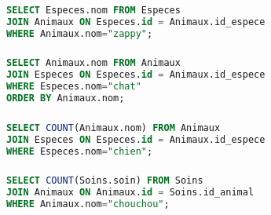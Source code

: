 \documentclass[svgnames,11pt]{beamer}
\begin{document}
\begin{frame}[fragile]
    \frametitle{}

\begin{center}
\begin{lstlisting}[language=SQL , basicstyle=\ttfamily\small, xleftmargin=.5em, xrightmargin=0em]
SELECT Especes.nom FROM Especes
JOIN Animaux ON Especes.id = Animaux.id_espece
WHERE Animaux.nom="zappy";
\end{lstlisting}
\label{CODE}
\end{center}

\end{frame} 
\begin{frame}[fragile]
    \frametitle{}

\begin{center}
\begin{lstlisting}[language=SQL , basicstyle=\ttfamily\small, xleftmargin=.5em, xrightmargin=0em]
SELECT Animaux.nom FROM Animaux
JOIN Especes ON Especes.id = Animaux.id_espece
WHERE Especes.nom="chat"
ORDER BY Animaux.nom;
\end{lstlisting}
\label{CODE}
\end{center}

\end{frame}
\begin{frame}[fragile]
    \frametitle{}

\begin{center}
\begin{lstlisting}[language=SQL , basicstyle=\ttfamily\small, xleftmargin=.5em, xrightmargin=0em]
SELECT COUNT(Animaux.nom) FROM Animaux
JOIN Especes ON Especes.id = Animaux.id_espece
WHERE Especes.nom="chien";
\end{lstlisting}
\label{CODE}
\end{center}

\end{frame}
\begin{frame}[fragile]
    \frametitle{}

\begin{center}
\begin{lstlisting}[language=SQL , basicstyle=\ttfamily\small, xleftmargin=.5em, xrightmargin=0em]
SELECT COUNT(Soins.soin) FROM Soins
JOIN Animaux ON Animaux.id = Soins.id_animal
WHERE Animaux.nom="chouchou";
\end{lstlisting}
\label{CODE}
\end{center}

\end{frame}
\end{document}
